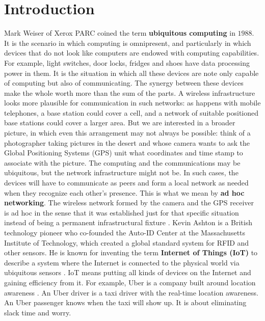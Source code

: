 \chapter{Introduction} %
\label{cha:introduction}
	
	Mark Weiser of Xerox PARC \cite{weiser1991computer} coined the term \textbf{ubiquitous computing} in $1988$. 
	It is the scenario in which computing is omnipresent, and particularly in which devices that do not look like computers are endowed with computing capabilities.
	For example, light switches, door locks, fridges and shoes have data processing power in them.
	It is the situation in which all these devices are note only capable of computing but also of communicating.
	The synergy between these devices make the whole worth more than the sum of the parts.
	A wireless infrastructure looks more plausible for communication in such networks: as happens with mobile telephones, a base station could cover a cell, and a network of suitable positioned base stations could cover a larger area.
	But we are interested in a broader picture, in which even this arrangement may not always be possible: think of a photographer taking pictures in the desert and whose camera wants to ask the Global Positioning Systems (GPS) unit what coordinates and time stamp to associate with the picture.
	The computing and the communications may be ubiquitous, but the network infrastructure might not be.
	In such cases, the devices will have to communicate as peers and form a local network as needed when they recognize each other's presence.
	This is what we mean by \textbf{ad hoc networking}.
	The wireless network formed by the camera and the GPS receiver is ad hoc in the sense that it was established just for that specific situation instead of being a permanent infrastructural fixture \cite{2002-Stajano-ubiquitous}.
	Kevin Ashton is a British technology pioneer who co-founded the Auto-ID Center at the Massachusetts Institute of Technology, which created a global standard system for RFID and other sensors.
	He is known for inventing the term \textbf{Internet of Things (IoT)} to describe a system where the Internet is connected to the physical world via ubiquitous sensors \cite{ashton2009internet}.
	IoT means putting all kinds of devices on the Internet and gaining efficiency from it. 
	For example, Uber is a company built around location awareness \cite{Uber}.
	An Uber driver is a taxi driver with the real-time location awareness.
	An Uber passenger knows when the taxi will show up.
	It is about eliminating slack time and worry.
